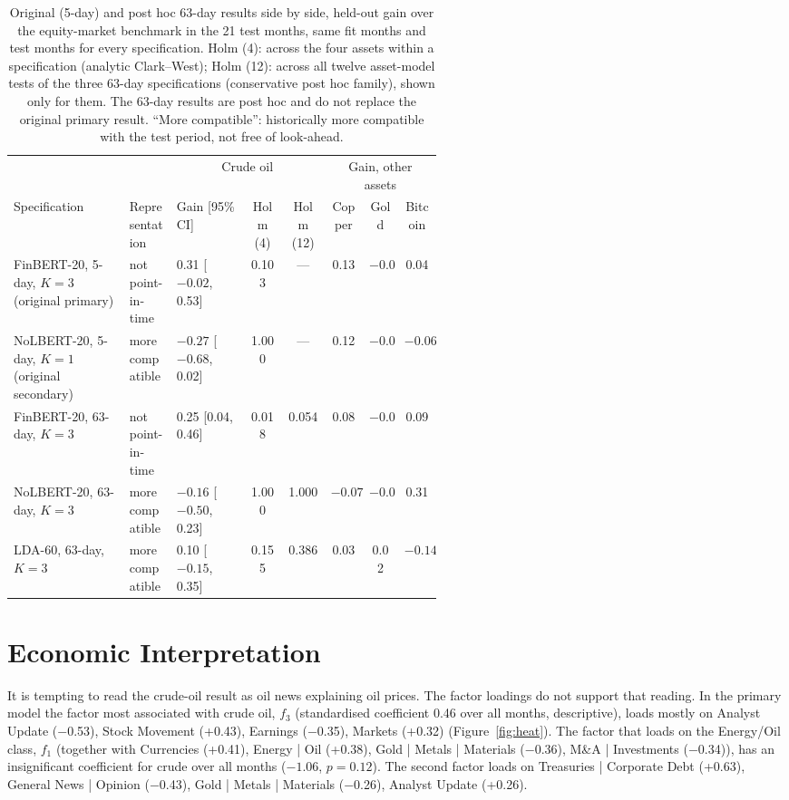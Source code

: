 \documentclass[11pt]{article}
\begin{document}
\begin{table}[t]
\centering\footnotesize
\begin{tabular}{@{}p{0.27\linewidth}p{0.11\linewidth}p{0.17\linewidth}ccccc@{}}
\toprule
 & & \multicolumn{3}{c}{Crude oil} & \multicolumn{3}{c}{Gain, other assets} \\
\cmidrule(lr){3-5}\cmidrule(l){6-8}
Specification & Representation & Gain [95\% CI] & Holm (4) & Holm (12) & Copper & Gold & Bitcoin \\
\midrule
FinBERT-20, 5-day, $K=3$ (original primary) & not point-in-time & 0.31 [$-0.02$, 0.53] & 0.103 & --- & 0.13 & $-0.09$ & 0.04 \\
NoLBERT-20, 5-day, $K=1$ (original secondary) & more compatible & $-0.27$ [$-0.68$, 0.02] & 1.000 & --- & 0.12 & $-0.08$ & $-0.06$ \\
FinBERT-20, 63-day, $K=3$ & not point-in-time & 0.25 [0.04, 0.46] & 0.018 & 0.054 & 0.08 & $-0.03$ & 0.09 \\
NoLBERT-20, 63-day, $K=3$ & more compatible & $-0.16$ [$-0.50$, 0.23] & 1.000 & 1.000 & $-0.07$ & $-0.07$ & 0.31 \\
LDA-60, 63-day, $K=3$ & more compatible & 0.10 [$-0.15$, 0.35] & 0.155 & 0.386 & 0.03 & 0.02 & $-0.14$ \\
\bottomrule
\end{tabular}
\caption{Original (5-day) and post hoc 63-day results side by side, held-out gain over the equity-market benchmark in the 21 test months, same fit months and test months for every specification. Holm (4): across the four assets within a specification (analytic Clark--West); Holm (12): across all twelve asset-model tests of the three 63-day specifications (conservative post hoc family), shown only for them. The 63-day results are post hoc and do not replace the original primary result. ``More compatible'': historically more compatible with the test period, not free of look-ahead.}
\label{tab:robust}
\end{table}

\section{Economic Interpretation}
\label{sec:interp}

It is tempting to read the crude-oil result as oil news explaining oil prices. The factor loadings do not support that reading. In the primary model the factor most associated with crude oil, $f_3$ (standardised coefficient 0.46 over all months, descriptive), loads mostly on Analyst Update ($-$0.53), Stock Movement (+0.43), Earnings ($-$0.35), Markets (+0.32) (Figure~\ref{fig:heat}). The factor that loads on the Energy/Oil class, $f_1$ (together with Currencies (+0.41), Energy | Oil (+0.38), Gold | Metals | Materials ($-$0.36), M\&A | Investments ($-$0.34)), has an insignificant coefficient for crude over all months ($-1.06$, $p=0.12$). The second factor loads on Treasuries | Corporate Debt (+0.63), General News | Opinion ($-$0.43), Gold | Metals | Materials ($-$0.26), Analyst Update (+0.26).
\end{document}

